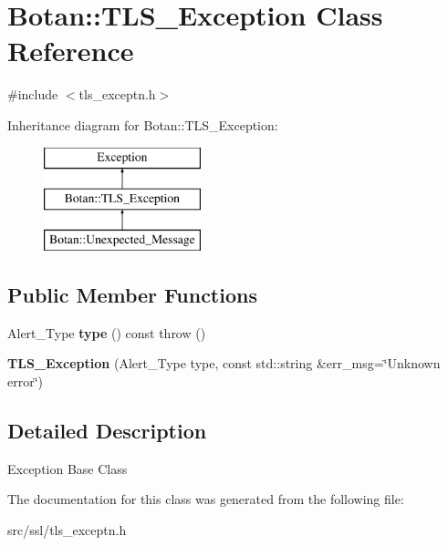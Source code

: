 \hypertarget{classBotan_1_1TLS__Exception}{\section{Botan\-:\-:T\-L\-S\-\_\-\-Exception Class Reference}
\label{classBotan_1_1TLS__Exception}
}


{\ttfamily \#include $<$tls\-\_\-exceptn.\-h$>$}

Inheritance diagram for Botan\-:\-:T\-L\-S\-\_\-\-Exception\-:\begin{figure}[H]
\begin{center}
\leavevmode
\includegraphics[height=3.000000cm]{classBotan_1_1TLS__Exception}
\end{center}
\end{figure}
\subsection*{Public Member Functions}
\begin{DoxyCompactItemize}
\item 
\hypertarget{classBotan_1_1TLS__Exception_afe33d126e77876e7c05d9d9a068b397d}{Alert\-\_\-\-Type {\bfseries type} () const   throw ()}\label{classBotan_1_1TLS__Exception_afe33d126e77876e7c05d9d9a068b397d}

\item 
\hypertarget{classBotan_1_1TLS__Exception_a6bca78f0aba6fa1f344df7bfac3cf843}{{\bfseries T\-L\-S\-\_\-\-Exception} (Alert\-\_\-\-Type type, const std\-::string \&err\-\_\-msg=\char`\"{}Unknown error\char`\"{})}\label{classBotan_1_1TLS__Exception_a6bca78f0aba6fa1f344df7bfac3cf843}

\end{DoxyCompactItemize}


\subsection{Detailed Description}
Exception Base Class 

The documentation for this class was generated from the following file\-:\begin{DoxyCompactItemize}
\item 
src/ssl/tls\-\_\-exceptn.\-h\end{DoxyCompactItemize}
